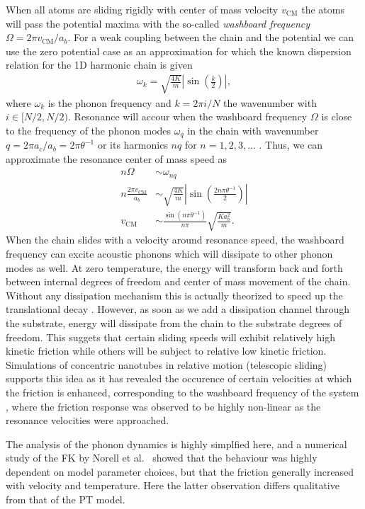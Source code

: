 When all atoms are sliding rigidly with center of mass velocity $v_{{\text{CM}}}$ the atoms will pass the potential maxima with the so-called \textit{washboard frequency} $\Omega = 2\pi v_{{\text{CM}}} / a_b$. For a weak coupling between the chain and the potential we can use the zero potential case as an approximation for which the known dispersion relation for the 1D harmonic chain is given \cite[p. 92]{Kittel2004}
\begin{align*}
  \omega_k = \sqrt{\frac{4 K}{m}} \left|\sin{\left(\frac{k}{2}\right)}\right|,
\end{align*}
where $\omega_k$ is the phonon frequency and $k = 2\pi i / N$ the wavenumber with $i\in [N/2, N/2)$. Resonance will accour when the washboard frequency $\Omega$ is close to the frequency of the phonon modes $\omega_q$ in the chain with wavenumber $q = 2\pi a_c / a_b = 2\pi \theta^{-1}$ or its harmonics $nq$ for $n = 1, 2, 3, \hdots$ \cite{van_den_Ende_2012}. Thus, we can approximate the resonance center of mass speed as
\begin{align*}
    n \Omega &\sim \omega_{nq} \\
    n \frac{2\pi v_{\text{CM}}}{a_b} &\sim \sqrt{\frac{4K}{m}} \left| \sin{\left(\frac{2n \pi \theta^{-1}}{2}\right)}\right| \\
    v_{\text{CM}} &\sim \frac{\sin{(n\pi \theta^{-1})}}{n \pi} \sqrt{\frac{Ka_b^2}{m}}.
\end{align*}
When the chain slides with a velocity around resonance speed, the washboard
frequency can excite acoustic phonons which will dissipate to other phonon modes
as well. At zero temperature, the energy will transform back and forth between
internal degrees of freedom and center of mass movement of the chain. Without any dissipation mechanism this is actually theorized to speed up the translational decay \cite{FK2D}. However, as soon as we add a dissipation channel through the substrate, energy will dissipate from the chain to the substrate degrees of freedom. This suggets that certain sliding speeds will exhibit relatively high kinetic friction while
others will be subject to relative low kinetic friction. Simulations of
concentric nanotubes in relative motion (telescopic sliding) supports this idea as it has revealed the
occurence of certain velocities at which the friction is enhanced, corresponding
to the washboard frequency of the system \cite{Manini_2016}, where the friction
response was observed to be highly non-linear as the resonance velocities were
approached. 

The analysis of the phonon dynamics is highly simplfied here, and a numerical study of the \acrshort{FK} by Norell et al.\ \cite{FK2D} showed that the behaviour was highly dependent on model parameter choices, but that the friction generally increased with velocity and temperature. Here the latter observation differs qualitative from that of the \acrshort{PT} model.



